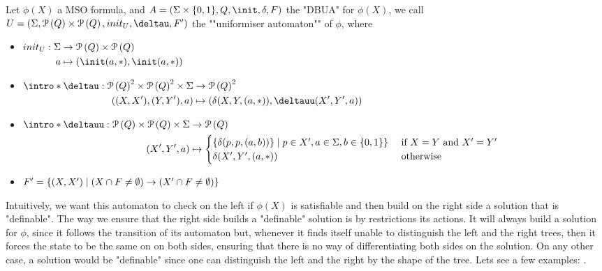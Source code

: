 \documentclass[a4paper,UKenglish,cleveref, autoref, thm-restate]{lipics-v2021}
\begin{document}
\begin{definition}
	Let $\phi(X)$ a MSO formula, and $A =  (\Sigma \times \{0,1\}, Q, \init, \delta, F)$ the "DBUA" for $\phi(X)$, we call $U = (\Sigma, \parts Q \times \parts Q,init_U, \deltau, F')$
	the ""uniformiser automaton"" of $\phi$, where
	\begin{itemize}
		\item$\begin{aligned}[t]
				      init_U : \Sigma & \to      \parts Q \times \parts {Q} \\
				      a               & \mapsto  ( \init(a,*), \init(a,*))
			      \end{aligned}$
		\item$\begin{aligned}[t]
				      \intro*\deltau : {\parts Q}^2 \times {\parts {Q}}^2 \times \Sigma & \to    {\parts {Q}}^2                           \\
				      ((X,X'),(Y,Y'),a)                                                 & \mapsto (\delta(X,Y,(a,*)), \deltauu (X',Y',a)) \\
			      \end{aligned}$
		\item $ \begin{aligned}[t]
				      \intro*\deltauu : \parts Q \times \parts Q \times \Sigma & \to \parts Q                                                                                                               \\
				      (X', Y', a)                                              & \mapsto \begin{cases}
					                                                                         \{\delta(p,p,(a,b))\}     \mid p \in X', a \in \Sigma, b \in \set{0,1}\} & \text{ if }  X = Y \text{ and } X' = Y' \\
					                                                                         \delta(X',Y',(a,*))                                                      & \text{ otherwise}
				                                                                         \end{cases}
			      \end{aligned}$
		\item $F' = \left\{(X,X') \mid (X \cap F \neq \emptyset) \rightarrow (X' \cap F \neq \emptyset)\right\}$
	\end{itemize}
\end{definition}


Intuitively, we want this automaton to check on the left if $\phi(X)$ is satisfiable and then build on the right side a
solution that is "definable". The way we ensure that the right side builds a "definable" solution is by restrictions its actions.
It will always build a solution for $\phi$, since it follows the transition of its automaton but, whenever it finds itself unable to
distinguish the left and the right trees, then it forces the state to be the same on on both sides, ensuring that there is no way of differentiating both sides on the
solution. On any other case, a solution would be "definable" since one can distinguish the left and the right by the shape of the tree.
Lets see a few examples: 
.
\end{document}
